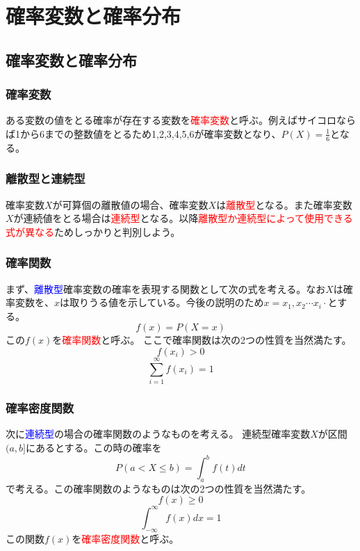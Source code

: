 \documentclass[a4paper,10pt]{jarticle}
\begin{document}
\section{確率変数と確率分布}
\subsection{確率変数と確率分布}
\subsubsection{確率変数}
ある変数の値をとる確率が存在する変数を\textcolor{red}{確率変数}と呼ぶ。例えばサイコロならば1から6までの整数値をとるため1,2,3,4,5,6が確率変数となり、$P(X)=\frac{1}{6}$となる。
\subsubsection{離散型と連続型}
確率変数$X$が可算個の離散値の場合、確率変数$X$は\textcolor{red}{離散型}となる。また確率変数$X$が連続値をとる場合は\textcolor{red}{連続型}となる。以降\textcolor{red}{離散型か連続型によって使用できる式が異なる}ためしっかりと判別しよう。
\subsubsection{確率関数}
まず、\textcolor{blue}{離散型}確率変数の確率を表現する関数として次の式を考える。なお$X$は確率変数を、$x$は取りうる値を示している。今後の説明のため$x=x_1,x_2\cdots x_i\cdot$とする。
\begin{equation}
    f(x)=P(X=x)\tag{2,1}
\end{equation}
この$f(x)$を\textcolor{red}{確率関数}と呼ぶ。
ここで確率関数は次の2つの性質を当然満たす。
\begin{equation}
    f(x_i)>0\tag{2,2}
\end{equation}
\begin{equation}
    \sum^\infty_{i=1}f(x_i)= 1\tag{2,3}
\end{equation}
\subsubsection{確率密度関数}
次に\textcolor{blue}{連続型}の場合の確率関数のようなものを考える。
連続型確率変数$X$が区間$(a,b]$にあるとする。この時の確率を
\begin{equation}
    P(a<X\leq b)= \int_{a}^{b} f(t)dt\tag{2,4}
\end{equation}
で考える。この確率関数のようなものは次の2つの性質を当然満たす。
\begin{equation}
    f(x)\geq 0\tag{2,5}
\end{equation}
\begin{equation}
    \int_{-\infty}^{\infty} f(x)dx= 1\tag{2,6}
\end{equation}
この関数$f(x)$を\textcolor{red}{確率密度関数}と呼ぶ。
\end{document}

